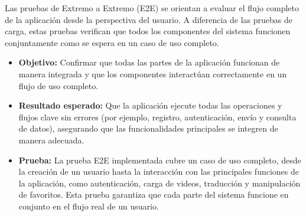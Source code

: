 Las pruebas de Extremo a Extremo (E2E) se orientan a evaluar el flujo completo de la aplicación desde la perspectiva del usuario. A diferencia de las pruebas de carga, estas pruebas verifican que todos los componentes del sistema funcionen conjuntamente como se espera en un caso de uso completo.

\begin{itemize} 
\item \textbf{Objetivo:} Confirmar que todas las partes de la aplicación funcionan de manera integrada y que los componentes interactúan correctamente en un flujo de uso completo. \item \textbf{Resultado esperado:} Que la aplicación ejecute todas las operaciones y flujos clave sin errores (por ejemplo, registro, autenticación, envío y consulta de datos), asegurando que las funcionalidades principales se integren de manera adecuada. 
\item \textbf{Prueba:} La prueba E2E implementada cubre un caso de uso completo, desde la creación de un usuario hasta la interacción con las principales funciones de la aplicación, como autenticación, carga de videos, traducción y manipulación de favoritos. Esta prueba garantiza que cada parte del sistema funcione en conjunto en el flujo real de un usuario. 
\end{itemize}













